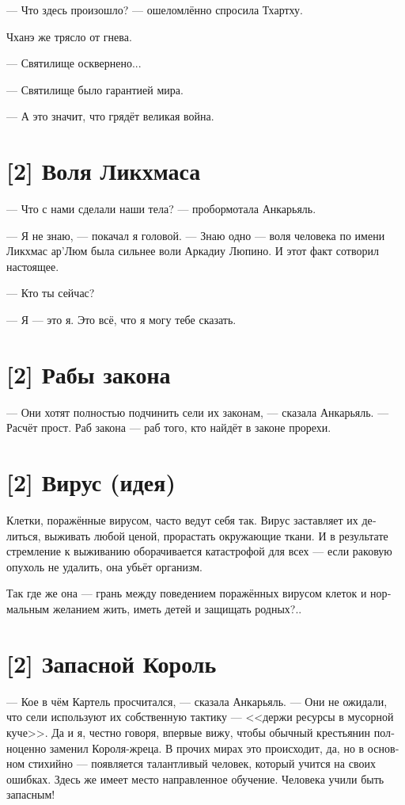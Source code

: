 \documentclass[a4paper,12pt,fleqn]{book}\usepackage{polyglossia}\setdefaultlanguage[babelshorthands=true]{russian}\setotherlanguage{english}\defaultfontfeatures{Ligatures=TeX,Mapping=tex-text}\usepackage{xcolor}\newcommand{\ml}[3]{#2}
\newcommand{\textspace}{\vspace{1em}{\centering\Large\bfseries<...>\par}\vspace{1em}}
\begin{document}
{--- Что здесь произошло? --- ошеломлённо спросила Тхартху.

Чханэ же трясло от гнева.

--- Святилище осквернено...

\textspace

--- Святилище было гарантией мира.

--- А это значит, что грядёт великая война.

\section{[2] Воля Ликхмаса}

--- Что с нами сделали наши тела? --- пробормотала Анкарьяль.

--- Я не знаю, --- покачал я головой.
--- Знаю одно --- воля человека по имени Ликхмас ар'Люм была сильнее воли Аркадиу Люпино.
И этот факт сотворил настоящее.

--- Кто ты сейчас?

--- Я --- это я.
Это всё, что я могу тебе сказать.

\section{[2] Рабы закона}

--- Они хотят полностью подчинить сели их законам, --- сказала Анкарьяль.
--- Расчёт прост.
Раб закона --- раб того, кто найдёт в законе прорехи.

\section{[2] Вирус (идея)}

Клетки, поражённые вирусом, часто ведут себя так.
Вирус заставляет их делиться, выживать любой ценой, прорастать окружающие ткани.
И в результате стремление к выживанию оборачивается катастрофой для всех --- если раковую опухоль не удалить, она убьёт организм.

Так где же она --- грань между поведением поражённых вирусом клеток и нормальным желанием жить, иметь детей и защищать родных?..

\section{[2] Запасной Король}

--- Кое в чём Картель просчитался, --- сказала Анкарьяль.
--- Они не ожидали, что сели используют их собственную тактику --- <<держи ресурсы в мусорной куче>>.
Да и я, честно говоря, впервые вижу, чтобы обычный крестьянин полноценно заменил Короля-жреца.
В прочих мирах это происходит, да, но в основном стихийно --- появляется талантливый человек, который учится на своих ошибках.
Здесь же имеет место направленное обучение.
Человека учили быть запасным!

}
\end{document}
